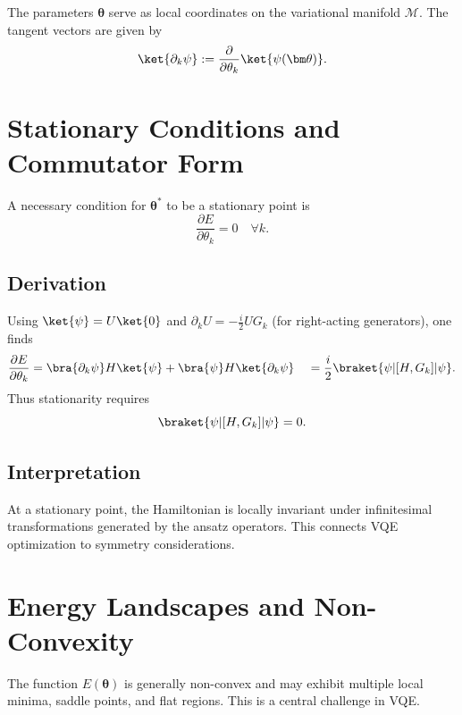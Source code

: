 \documentclass{book}
\begin{document}
The parameters $\bm\theta$ serve as local coordinates on the variational manifold $\mathcal{M}$. The tangent vectors are given by
\begin{equation}
\ket{\partial_k \psi} := \frac{\partial}{\partial \theta_k} \ket{\psi(\bm\theta)}.
\end{equation}

\section{Stationary Conditions and Commutator Form}

A necessary condition for $\bm\theta^*$ to be a stationary point is
\begin{equation}
\frac{\partial E}{\partial \theta_k} = 0 \quad \forall k.
\end{equation}

\subsection{Derivation}

Using $\ket{\psi} = U\ket{0}$ and $\partial_k U = -\frac{i}{2} U G_k$ (for right-acting generators), one finds
\begin{align}
\frac{\partial E}{\partial \theta_k} &= \bra{\partial_k \psi} H \ket{\psi} + \bra{\psi} H \ket{\partial_k \psi} \
&= \frac{i}{2} \braket{\psi| [H, G_k] |\psi}.
\end{align}
Thus stationarity requires
\begin{equation}
\braket{\psi| [H, G_k] |\psi} = 0.
\end{equation}

\subsection{Interpretation}

At a stationary point, the Hamiltonian is locally invariant under infinitesimal transformations generated by the ansatz operators. This connects VQE optimization to symmetry considerations.

\section{Energy Landscapes and Non-Convexity}

The function $E(\bm\theta)$ is generally non-convex and may exhibit multiple local minima, saddle points, and flat regions. This is a central challenge in VQE.
\end{document}
